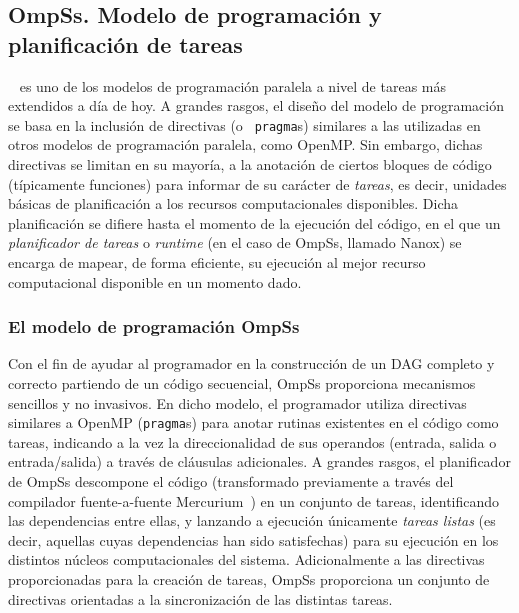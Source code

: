 %
%
%
%

\subsection{OmpSs. Modelo de programación y planificación de tareas}

\ompss~\cite{ompssweb,ompss} es uno de los modelos de programación paralela
a nivel de tareas más extendidos a día de hoy. A grandes rasgos, el diseño
del modelo de programación se basa en la inclusión de directivas (o {\tt
  pragma}s) similares a las utilizadas en otros modelos de programación
paralela, como OpenMP. Sin embargo, dichas directivas se limitan en su
mayoría, a la anotación de ciertos bloques de código (típicamente
funciones) para informar de su carácter de {\em tareas}, es decir, unidades
básicas de planificación a los recursos computacionales disponibles. Dicha
planificación se difiere hasta el momento de la ejecución del código, en el
que un {\em planificador de tareas} o {\em runtime} (en el caso de OmpSs,
llamado Nanox) se encarga de mapear, de forma eficiente, su ejecución al
mejor recurso computacional disponible en un momento dado.

\subsubsection{El modelo de programación OmpSs}

Con el fin de ayudar al programador en la construcción de un DAG completo y
correcto partiendo de un código secuencial, OmpSs proporciona mecanismos
sencillos y no invasivos. En dicho modelo, el programador utiliza
directivas similares a OpenMP ({\tt pragma}s) para anotar rutinas
existentes en el código como tareas, indicando a la vez la direccionalidad
de sus operandos (entrada, salida o entrada/salida) a través de cláusulas
adicionales. A grandes rasgos, el planificador de OmpSs descompone el
código (transformado previamente a través del compilador fuente-a-fuente
Mercurium~\cite{Mercurium}) en un conjunto de tareas, identificando las
dependencias entre ellas, y lanzando a ejecución únicamente {\em tareas
  listas} (es decir, aquellas cuyas dependencias han sido satisfechas) para
su ejecución en los distintos núcleos computacionales del
sistema. Adicionalmente a las directivas proporcionadas para la creación de
tareas, OmpSs proporciona un conjunto de directivas orientadas a la
sincronización de las distintas tareas.

